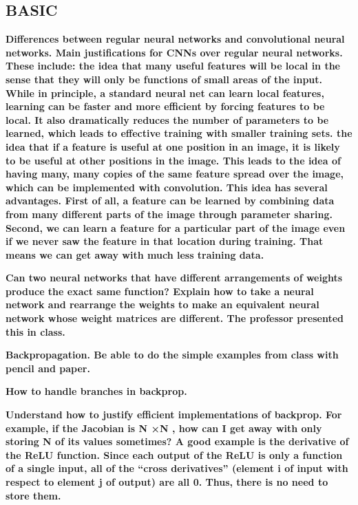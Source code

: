 \documentclass[10pt,letterpaper]{article}
\begin{document}
\subsection{BASIC}
\subitem \textbf{ Differences between regular neural networks and convolutional neural networks. Main justifications for CNNs over regular neural networks.  These include:
\subsubitem the idea that many useful features will be local in the sense that they will only be functions of small areas of the input. While in principle, a standard neural net can learn local features, learning can be faster and more efficient by forcing features to be local. It also dramatically reduces the number of parameters to be learned, which leads to effective training with smaller training sets.
\subsubitem the idea that if a feature is useful at one position in an image, it is likely to be useful at other positions in the image. This leads to the idea of having many, many copies of the same feature spread over the image, which can be implemented with convolution. This idea has several advantages. First of all, a feature can be learned by combining data from many different parts of the image through parameter sharing. Second, we can learn a feature for a particular part of the image even if we never saw the feature in that location during training. That means we can get away with much less training data.}
\begin{solution}
\end{solution}

\subitem \textbf{ Can two neural networks that have different arrangements of weights produce the exact same function? Explain how to take a neural network and rearrange the weights to make an equivalent neural network whose weight matrices are different. The professor presented this in class.}
\begin{solution}
\end{solution}

\subitem \textbf{ Backpropagation. Be able to do the simple examples from class with pencil and paper.}
\begin{solution}
\end{solution}

\subitem \textbf{ How to handle branches in backprop.}
\begin{solution}
\end{solution}

\subitem \textbf{ Understand how to justify efficient implementations of backprop. For example, if the Jacobian is N ×N , how can I get away with only storing N of its values sometimes? A good example is the derivative of the ReLU function. Since each output of the ReLU is only a function of a single input, all of the “cross derivatives” (element i of input with respect to element j of output) are all 0. Thus, there is no need to store them.}
\begin{solution}
\end{solution}
\end{document}
